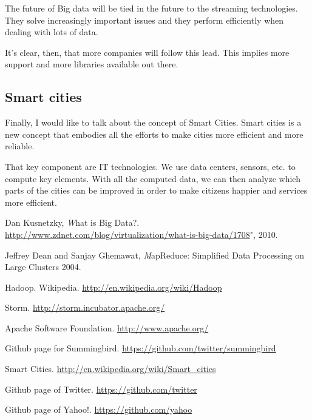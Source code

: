 \documentclass[a4paper,12pt]{article}
\begin{document}
The future of Big data will be tied in the future to the streaming
technologies. They solve increasingly important issues and they perform efficiently
when dealing with lots of data.

It's clear, then, that more companies will follow this lead. This implies more
support and more libraries available out there.

\subsection{Smart cities}

Finally, I would like to talk about the concept of Smart Cities\cite{smart}.
Smart cities is a new concept that embodies all the efforts to make cities more
efficient and more reliable.

That key component are IT technologies. We use data centers, sensors, etc. to
compute key elements. With all the computed data, we can then analyze which
parts of the cities can be improved in order to make citizens happier and
services more efficient.

\newpage

\renewcommand\bibname{Bibliography}
\begin{thebibliography}{9}

  Dan Kusnetzky,
  {\emph What is Big Data?}.
  \url{http://www.zdnet.com/blog/virtualization/what-is-big-data/1708}",
  2010.

  Jeffrey Dean and Sanjay Ghemawat,
  {\emph MapReduce: Simplified Data Processing on Large Clusters}
  2004.

  Hadoop. Wikipedia.
  \url{http://en.wikipedia.org/wiki/Hadoop}

  Storm.
  \url{http://storm.incubator.apache.org/}

  Apache Software Foundation.
  \url{http://www.apache.org/}

  Github page for Summingbird.
  \url{https://github.com/twitter/summingbird}

  Smart Cities.
  \url{http://en.wikipedia.org/wiki/Smart_cities}

  Github page of Twitter.
  \url{https://github.com/twitter}

  Github page of Yahoo!.
  \url{https://github.com/yahoo}

\end{thebibliography}
\end{document}

